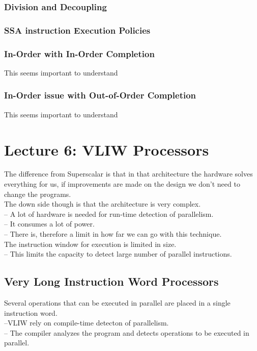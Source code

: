 \documentclass[titlepage, a4paper]{article}
\begin{document}
\subsubsection{Division and Decoupling}

\subsubsection{SSA instruction Execution Policies}

\subsubsection{In-Order with In-Order Completion}
This seems important to understand

\subsubsection{In-Order issue with Out-of-Order Completion}
This seems important to understand

\section{Lecture 6: VLIW Processors}
The difference from Superscalar is that in that architecture the hardware solves everything for us, if improvements are made on the design we don't need to change the programs. \\
The down side though is that the architecture is very complex. \\
-- A lot of hardware is needed for run-time detection of parallelism. \\
-- It consumes a lot of power. \\
-- There is, therefore a limit in how far we can go with this technique. \\

The instruction window for execution is limited in size. \\
-- This limits the capacity to detect large number of parallel instructions.

\subsection{Very Long Instruction Word Processors}
Several operations that can be executed in parallel are placed in a single instruction word. \\
--VLIW rely on compile-time detecton of parallelism. \\
-- The compiler analyzes the program and detects operations to be executed in parallel. \\
\end{document}

